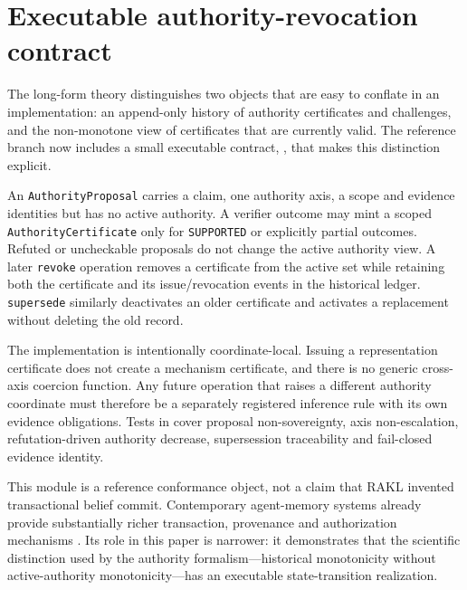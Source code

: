 \section{Executable authority-revocation contract}

The long-form theory distinguishes two objects that are easy to conflate in an implementation: an append-only history of authority certificates and challenges, and the non-monotone view of certificates that are currently valid. The reference branch now includes a small executable contract, , that makes this distinction explicit.

An \texttt{AuthorityProposal} carries a claim, one authority axis, a scope and evidence identities but has no active authority. A verifier outcome may mint a scoped \texttt{AuthorityCertificate} only for \texttt{SUPPORTED} or explicitly partial outcomes. Refuted or uncheckable proposals do not change the active authority view. A later \texttt{revoke} operation removes a certificate from the active set while retaining both the certificate and its issue/revocation events in the historical ledger. \texttt{supersede} similarly deactivates an older certificate and activates a replacement without deleting the old record.

The implementation is intentionally coordinate-local. Issuing a representation certificate does not create a mechanism certificate, and there is no generic cross-axis coercion function. Any future operation that raises a different authority coordinate must therefore be a separately registered inference rule with its own evidence obligations. Tests in  cover proposal non-sovereignty, axis non-escalation, refutation-driven authority decrease, supersession traceability and fail-closed evidence identity.

This module is a reference conformance object, not a claim that RAKL invented transactional belief commit. Contemporary agent-memory systems already provide substantially richer transaction, provenance and authorization mechanisms \cite{memtx2026,ppmf2026,tmanm2026,committime2026}. Its role in this paper is narrower: it demonstrates that the scientific distinction used by the authority formalism---historical monotonicity without active-authority monotonicity---has an executable state-transition realization.
